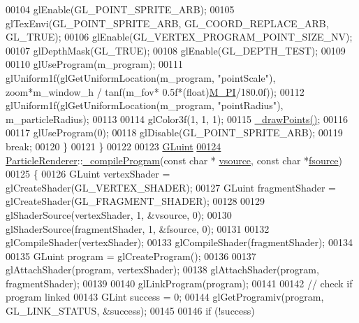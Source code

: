 \begin{DoxyCode}
00104             glEnable(GL\_POINT\_SPRITE\_ARB);
00105             glTexEnvi(GL\_POINT\_SPRITE\_ARB, GL\_COORD\_REPLACE\_ARB, GL\_TRUE);
00106             glEnable(GL\_VERTEX\_PROGRAM\_POINT\_SIZE\_NV);
00107             glDepthMask(GL\_TRUE);
00108             glEnable(GL\_DEPTH\_TEST);
00109 
00110             glUseProgram(m\_program);
00111             glUniform1f(glGetUniformLocation(m\_program, \textcolor{stringliteral}{"pointScale"}), zoom*m\_window\_h / tanf(m\_fov*
      0.5f*(\textcolor{keywordtype}{float})\hyperlink{render__particles_8cpp_ae71449b1cc6e6250b91f539153a7a0d3}{M\_PI}/180.0f));
00112             glUniform1f(glGetUniformLocation(m\_program, \textcolor{stringliteral}{"pointRadius"}), m\_particleRadius);
00113 
00114             glColor3f(1, 1, 1);
00115             \hyperlink{class_particle_renderer_a2683c43c010bff7973a977c1953f2bd6}{\_drawPoints}\hyperlink{class_particle_renderer_a2683c43c010bff7973a977c1953f2bd6}{(}\hyperlink{class_particle_renderer_a2683c43c010bff7973a977c1953f2bd6}{)};
00116 
00117             glUseProgram(0);
00118             glDisable(GL\_POINT\_SPRITE\_ARB);
00119             \textcolor{keywordflow}{break};
00120     \}
00121 \}
00122 
00123 \hyperlink{class_particle_renderer_a3a7af352d38734b6bfa425e3b207d60b}{GLuint}
\hypertarget{render__particles_8cpp_source_l00124}{}\hyperlink{class_particle_renderer_a3a7af352d38734b6bfa425e3b207d60b}{00124} \hyperlink{class_particle_renderer}{ParticleRenderer}::\hyperlink{class_particle_renderer_a3a7af352d38734b6bfa425e3b207d60b}{\_compileProgram}(\textcolor{keyword}{const} \textcolor{keywordtype}{char} *
      \hyperlink{class_particle_renderer_a3a7af352d38734b6bfa425e3b207d60b}{vsource}, \textcolor{keyword}{const} \textcolor{keywordtype}{char} *\hyperlink{class_particle_renderer_a3a7af352d38734b6bfa425e3b207d60b}{fsource})
00125 \{
00126     GLuint vertexShader = glCreateShader(GL\_VERTEX\_SHADER);
00127     GLuint fragmentShader = glCreateShader(GL\_FRAGMENT\_SHADER);
00128 
00129     glShaderSource(vertexShader, 1, &vsource, 0);
00130     glShaderSource(fragmentShader, 1, &fsource, 0);
00131 
00132     glCompileShader(vertexShader);
00133     glCompileShader(fragmentShader);
00134 
00135     GLuint program = glCreateProgram();
00136 
00137     glAttachShader(program, vertexShader);
00138     glAttachShader(program, fragmentShader);
00139 
00140     glLinkProgram(program);
00141 
00142     \textcolor{comment}{// check if program linked}
00143     GLint success = 0;
00144     glGetProgramiv(program, GL\_LINK\_STATUS, &success);
00145 
00146     \textcolor{keywordflow}{if} (!success)

\end{DoxyCode}
